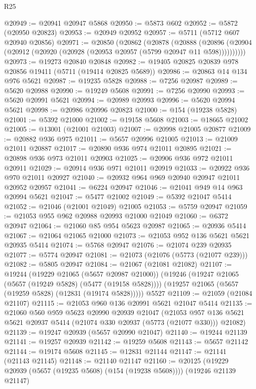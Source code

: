 \begin{lexlean}{R25}
\begin{coremodule}
@20949 := @20941 @20947 @5868
@20950 := @5873 @602
@20952 := @5872 (@20950 @20823)
@20953 := @20949 @20952
@20957 := @5711 (@5712 @607 @20940 @20856)
@20971 := @20850
    (@20862
      (@20878
        (@20888
          (@20896 (@20904 (@20912 (@20920 (@20928 (@20953 @20957 (@5799 @20947 @11 @598))))))))))
@20973 := @19273 @20840 @20848
@20982 := @19405 @20825 @20839 @978 @20856 @19411 (@5711 (@19414 @20825 @5689))
@20986 := @20863 @14 @134 @976 @5621
@20987 := @19235 @5828
@20988 := @7256 @20987
@20989 := @5620 @20988
@20990 := @19249 @5608
@20991 := @7256 @20990
@20993 := @5620 @20991 @5621
@20994 := @20989 @20993
@20996 := @5620 @20994 @5621
@20998 := @20986 @20996 @20823
@21000 := @154 (@19238 @5828)
@21001 := @5392 @21000
@21002 := @19158 @5608
@21003 := @18665 @21002
@21005 := @13001 (@21001 @21003)
@21007 := @20998 @21005 @20877
@21009 := @20882 @936 @975
@21011 := @5657 @20996 @21005
@21013 := @21009 @21011 @20887
@21017 := @20890 @936 @974 @21011 @20895
@21021 := @20898 @936 @973 @21011 @20903
@21025 := @20906 @936 @972 @21011 @20911
@21029 := @20914 @936 @971 @21011 @20919
@21033 := @20922 @936 @970 @21011 @20927
@21040 := @20932 @964 @969 @20940 @20947 @21011 @20952 @20957
@21041 := @6224 @20947
@21046 := @21041 @949 @14 @963 @20994 @5621
@21047 := @5477 @21002
@21049 := @5392 @21047 @5414
@21052 := @21046 (@21001 @21049) @21005
@21053 := @5759 @20947
@21059 := @21053 @955 @962 @20988 @20993 @21000 @21049
@21060 := @6372 @20947
@21064 := @21060 @85 @954 @5623 @20987
@21065 := @20936 @5414
@21067 := @21064 @21065 @21000
@21073 := @21053 @952 @136 @5621 @5621 @20935 @5414
@21074 := @5768 @20947
@21076 := @21074 @239 @20935
@21077 := @5774 @20947
@21081 := @21073 (@21076 (@5773 (@21077 @239)))
@21082 := @5805 @20947
@21084 := @21067 (@21081 @21082)
@21107 := @19244
    (@19229 @21065 (@5657 @20987 @21000))
    (@19246
      (@19247 @21065 (@5657 (@19249 @5828) (@5477 (@19158 @5828))))
      (@19257 @21065 (@5657 (@19259 @5828) (@12831 (@19174 @5828)))))
    @5527
@21109 := @21059 (@21084 @21107)
@21115 := @21053 @960 @136 @20991 @5621 @21047 @5414
@21135 := @21060
    @560
    @959
    @5623
    @20990
    @20939
    @21047
    (@21053 @957 @136 @5621 @5621 @20937 @5414 (@21074 @330 @20937 (@5773 (@21077 @330))) @21082)
@21139 := @19247 @20939 (@5657 @20990 @21047)
@21140 := @19244 @21139
@21141 := @19257 @20939
@21142 := @19259 @5608
@21143 := @5657 @21142
@21144 := @19174 @5608
@21145 := @12831 @21144
@21147 := @21141 (@21143 @21145)
@21148 := @21140 @21147
@21160 := @20125
    (@19229 @20939 (@5657 (@19235 @5608) (@154 (@19238 @5608))))
    (@19246 @21139 @21147)

\end{coremodule}
\end{lexlean}
